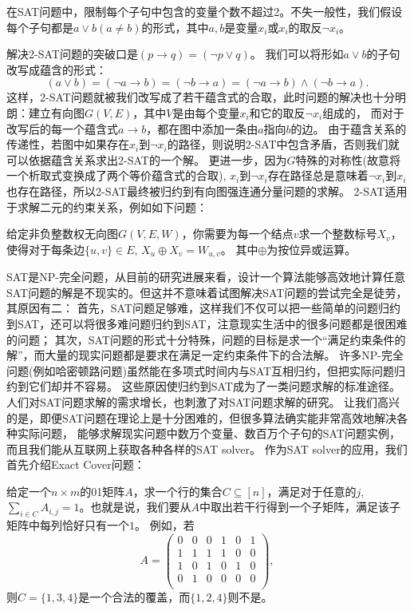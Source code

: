 \begin{prob}[2-SAT]
 在SAT问题中，限制每个子句中包含的变量个数不超过2。不失一般性，我们假设每个子句都是$a\lor b (a \neq b)$的形式，其中$a, b$是变量$x_i$或$x_i$的取反$\neg x_i$。
\end{prob}

解决2-SAT问题的突破口是$(p\to q) = (\neg p \lor q)$。
我们可以将形如$a\lor b$的子句改写成蕴含的形式：$$(a\lor b) = (\neg a \to b) = (\neg b \to a) = (\neg a \to b) \land (\neg b \to a).$$
这样，2-SAT问题就被我们改写成了若干蕴含式的合取，此时问题的解决也十分明朗：建立有向图$G(V,E)$，其中$V$是由每个变量$x_i$和它的取反$\neg x_i$组成的，
而对于改写后的每一个蕴含式$a\to b$，都在图中添加一条由$a$指向$b$的边。
由于蕴含关系的传递性，若图中如果存在$x_i$到$\neg x_i$的路径，则说明2-SAT中包含矛盾，否则我们就可以依据蕴含关系求出2-SAT的一个解。
更进一步，因为$G$特殊的对称性(故意将一个析取式变换成了两个等价蕴含式的合取), $x_i$到$\neg x_i$存在路径总是意味着$\neg x_i$到$x_i$也存在路径，所以2-SAT最终被归约到有向图强连通分量问题的求解。
2-SAT适用于求解二元的约束关系，例如如下问题：
\begin{prob}
 给定非负整数权无向图$G(V, E, W)$，你需要为每一个结点$v$求一个整数标号$X_v$，使得对于每条边$\{u, v\}\in E$, $X_u \oplus X_v = W_{u,v}$。
 其中$\oplus$为按位异或运算。
\end{prob}

SAT是NP-完全问题，从目前的研究进展来看，设计一个算法能够高效地计算任意SAT问题的解是不现实的。但这并不意味着试图解决SAT问题的尝试完全是徒劳，其原因有二：
首先，SAT问题足够难，这样我们不仅可以把一些简单的问题归约到SAT，还可以将很多难问题归约到SAT，注意现实生活中的很多问题都是很困难的问题；
其次，SAT问题的形式十分特殊，问题的目标是求一个``满足约束条件的解''，而大量的现实问题都是要求在满足一定约束条件下的合法解。
许多NP-完全问题(例如哈密顿路问题)虽然能在多项式时间内与SAT互相归约，但把实际问题归约到它们却并不容易。
这些原因使归约到SAT成为了一类问题求解的标准途径。人们对SAT问题求解的需求增长，也刺激了对SAT问题求解的研究。
让我们高兴的是，即便SAT问题在理论上是十分困难的，但很多算法确实能非常高效地解决各种实际问题，
能够求解现实问题中数万个变量、数百万个子句的SAT问题实例，而且我们能从互联网上获取各种各样的SAT solver。
作为SAT solver的应用，我们首先介绍Exact Cover问题：

\begin{prob}
 给定一个$n\times m$的01矩阵$A$，求一个行的集合$C\subseteq[n]$，满足对于任意的$j$, 
 $\sum_{i\in C} A_{i,j} = 1$。也就是说，我们要从$A$中取出若干行得到一个子矩阵，满足该子矩阵中每列恰好只有一个$1$。
 例如，若
 $$A = 
 \begin{pmatrix}
  0 & 0 & 0 & 1 & 0 & 1\\
  1 & 1 & 1 & 1 & 0 & 0\\
  1 & 0 & 1 & 0 & 1 & 0\\
  0 & 1 & 0 & 0 & 0 & 0\\
 \end{pmatrix},
 $$
 则$C=\{1, 3, 4\}$是一个合法的覆盖，而$\{1, 2, 4\}$则不是。
\end{prob}

